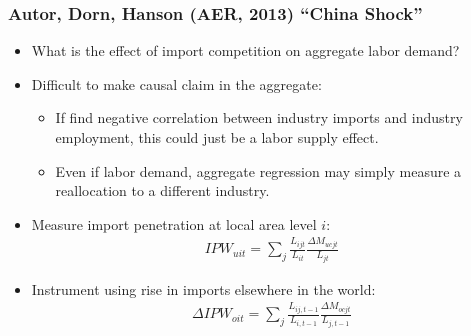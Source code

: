 \documentclass[english,xcolor=svgnames]{beamer}
\begin{document}
\begin{frame}
\frametitle[alignment=center]{Autor, Dorn, Hanson (AER, 2013) ``China Shock''}
\begin{itemize}
	\item What is the effect of import competition on aggregate labor demand?
	\item Difficult to make causal claim in the aggregate:
	\begin{itemize}
		\item If find negative correlation between industry imports and industry employment, this could just be a labor supply effect.
		\item Even if labor demand, aggregate regression may  simply measure a reallocation to a different industry.
	\end{itemize}
	\item Measure import penetration at local area level $i$:
	\begin{align*}
		IPW_{uit} = \sum_j \frac{L_{ijt}}{L_{it}}  \frac{\Delta M_{ucjt}}{L_{jt}}
	\end{align*}
	\item Instrument using rise in imports elsewhere in the world:
	\begin{align*}
		\Delta IPW_{oit} = \sum_j \frac{L_{ij,t-1}}{L_{i,t-1}}  \frac{\Delta M_{ocjt}}{L_{j,t-1}}
	\end{align*}
\end{itemize}
\end{frame}
\end{document}
